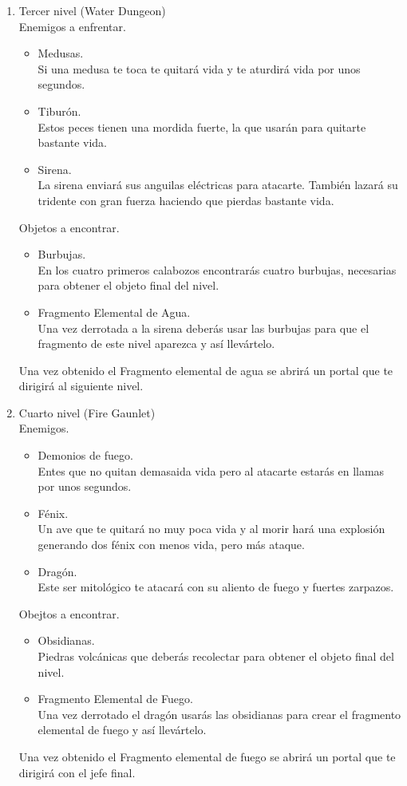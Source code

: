 \documentclass{article}
\begin{document}
\begin{enumerate}
    \item Tercer nivel (Water Dungeon)\\
    Enemigos a enfrentar.
    \begin{itemize}
        \item Medusas.\\
        Si una medusa te toca te quitará vida y te aturdirá vida por unos segundos.
        \item Tiburón.\\
        Estos peces tienen una mordida fuerte, la que usarán para quitarte bastante vida.
        \item Sirena.\\
        La sirena enviará sus anguilas eléctricas para atacarte. También lazará su tridente con gran fuerza haciendo que pierdas bastante vida.
    \end{itemize}
    Objetos a encontrar.
    \begin{itemize}
        \item Burbujas.\\
        En los cuatro primeros calabozos encontrarás cuatro burbujas, necesarias para obtener el objeto final del nivel.
        \item Fragmento Elemental de Agua.\\
        Una vez derrotada a la sirena deberás usar las burbujas para que el fragmento de este nivel aparezca y así llevártelo.
    \end{itemize}
    Una vez obtenido el Fragmento elemental de agua se abrirá un portal que te dirigirá al siguiente nivel.
    
    \item Cuarto nivel (Fire Gaunlet)\\
    Enemigos.
    \begin{itemize}
        \item Demonios de fuego.\\
        Entes que no quitan demasaida vida pero al atacarte estarás en llamas por unos segundos.
        \item Fénix.\\
        Un ave que te quitará no muy poca vida y al morir hará una explosión generando dos fénix con menos vida, pero más ataque.
        \item Dragón.\\
        Este ser mitológico te atacará con su aliento de fuego y fuertes zarpazos.
    \end{itemize}
    Obejtos a encontrar.
    \begin{itemize}
        \item Obsidianas.\\
        Piedras volcánicas que deberás recolectar para obtener el objeto final del nivel.
        \item Fragmento Elemental de Fuego.\\
        Una vez derrotado el dragón usarás las obsidianas para crear el fragmento elemental de fuego y así llevártelo.
    \end{itemize}
    Una vez obtenido el Fragmento elemental de fuego se abrirá un portal que te dirigirá con el jefe final.
    

\end{enumerate}
\end{document}

